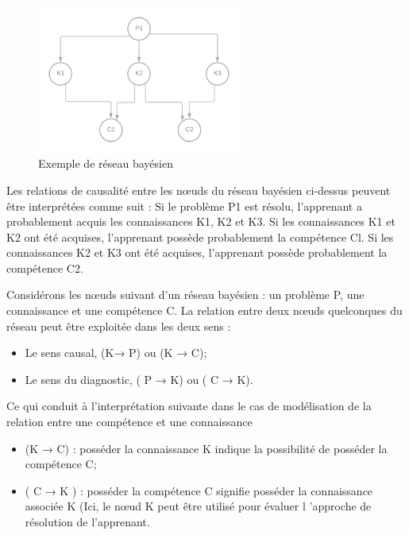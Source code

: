 \begin{description}
\begin{figure}[H]
    \centering
    \includegraphics[width=0.6\textwidth]{figures/r_by.png}
        \captionsetup{justification=centering}
    \caption{Exemple de réseau bayésien}
    \label{fig:r_by}
\end{figure}

Les relations de causalité entre les nœuds du réseau bayésien ci-dessus peuvent être interprétées comme suit : Si le problème P1 est résolu, l'apprenant a probablement acquis les connaissances K1, K2 et K3. Si les connaissances K1 et K2 ont été acquises, l'apprenant possède probablement la compétence Cl. Si les connaissances K2 et K3 ont été acquises, l'apprenant possède probablement la compétence C2. 

Considérons les nœuds suivant d'un réseau bayésien : un problème P, une connaissance et une compétence C. La relation entre deux nœuds quelconques du réseau peut être exploitée dans les deux sens  : 
\begin{itemize}
\item Le sens causal, (K→ P) ou (K → C); 
\item Le sens du diagnostic, ( P → K) ou ( C → K). 
\end{itemize}

Ce qui conduit à l'interprétation suivante dans le cas de modélisation de la relation entre une compétence et une connaissance
\begin{itemize}
\item  (K → C) : posséder la connaissance K indique la possibilité de posséder la compétence C;
\item ( C → K ) : posséder la compétence C signifie posséder la connaissance associée K (Ici, le nœud K peut être utilisé pour évaluer l 'approche de résolution de l'apprenant.  
\end{itemize}
\end{description}

